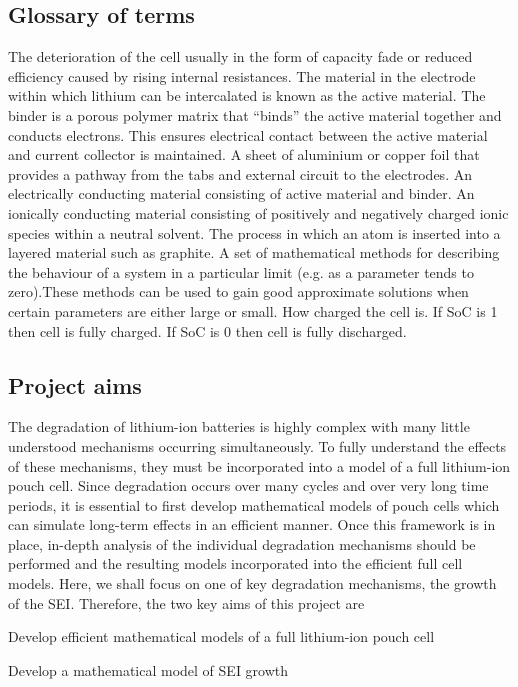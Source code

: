 \documentclass[english,a4paper,oneside,9pt]{extarticle}
\begin{document}
\subsection{Glossary of terms}

\begin{infommitemize}
	 The deterioration of the cell usually in the form of capacity fade or reduced efficiency caused by rising internal resistances.
	 The material in the electrode within which lithium can be intercalated is known as the active material.
	 The binder is a porous polymer matrix that ``binds'' the active material together and conducts electrons. This ensures electrical contact between the active material and current collector is maintained.
	 A sheet of aluminium or copper foil that provides a pathway from the tabs and external circuit to the electrodes.
	 An electrically conducting material consisting of active material and binder.
	 An ionically conducting material consisting of positively and negatively charged ionic species within a neutral solvent.
	 The process in which an atom is inserted into a layered material such as graphite.
	 A set of mathematical methods for describing the behaviour of a system in a particular limit (e.g. as a parameter tends to zero).These methods can be used to gain good approximate solutions when certain parameters are either large or small.
	 How charged the cell is. If SoC is 1 then cell is fully charged. If SoC is 0 then cell is fully discharged.
\end{infommitemize}

\subsection{Project aims}
The degradation of lithium-ion batteries is highly complex with many little understood mechanisms occurring simultaneously. To fully understand the effects of these mechanisms, they must be incorporated into a model of a full lithium-ion pouch cell. Since degradation occurs over many cycles and over very long time periods, it is essential to first develop mathematical models of pouch cells which can simulate long-term effects in an efficient manner. Once this framework is in place, in-depth analysis of the individual degradation mechanisms should be performed and the resulting models incorporated into the efficient full cell models. Here, we shall focus on one of key degradation mechanisms, the growth of the SEI. Therefore, the two key aims of this project are
\begin{infommitemize}
	\item Develop efficient mathematical models of a full lithium-ion pouch cell
	\item Develop a mathematical model of SEI growth
\end{infommitemize}
\end{document}
